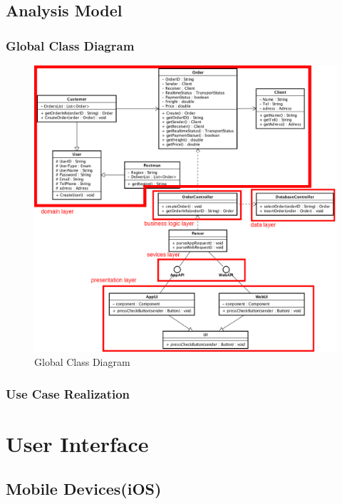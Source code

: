\documentclass[12pt]{scrreprt}
\begin{document}
\section{Analysis Model}
\subsection{Global Class Diagram}
\begin{figure}[H]
  \centering\includegraphics[width=6in]{DocumentRes/ClassDiagram.png}
  \caption{Global Class Diagram}
\end{figure}

\subsection{Use Case Realization}


\chapter{User Interface}
\section{Mobile Devices(iOS)}
\end{document}
